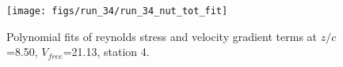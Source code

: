 \begin{figure}[H]
\centering
\texttt{[image: figs/run\_34/run\_34\_nut\_tot\_fit]}
\caption{Polynomial fits of reynolds stress and velocity gradient terms at $z/c$=8.50, $V_{free}$=21.13, station 4.}
\label{fig:run_34_nut_tot_fit}
\end{figure}


